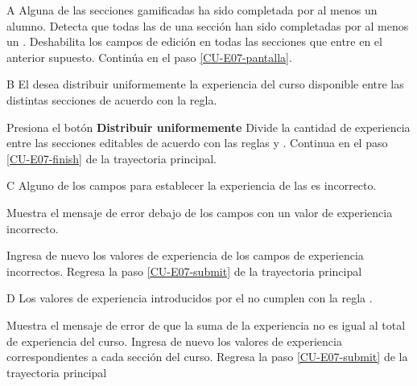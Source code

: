 \begin{UCtrayectoriaA}{A}{%
Alguna de las secciones gamificadas ha sido completada por al menos un alumno.
}
  \Sistema Detecta que todas las  de una sección
           han sido completadas por al menos un .
  \Sistema Deshabilita los campos de edición en todas las secciones que entre
           en el anterior supuesto.
  \Sistema Continúa en el paso \ref{CU-E07-pantalla}.
\end{UCtrayectoriaA}

\begin{UCtrayectoriaA}{B}{%
El  desea distribuir uniformemente la experiencia del curso
disponible entre las distintas secciones de acuerdo con la regla.}

  \Actor Presiona el botón {\bf Distribuir uniformemente}
  \Sistema Divide la cantidad de experiencia entre las secciones editables
           de acuerdo con las reglas  y .
  \Sistema Continua en el paso \ref{CU-E07-finish} de la trayectoria principal.
\end{UCtrayectoriaA}

\begin{UCtrayectoriaA}{C}{%
Alguno de los campos para establecer la experiencia de las %
 es incorrecto.}

  \Sistema Muestra el mensaje de error debajo de los campos con un valor de
           experiencia incorrecto.

  \Actor Ingresa de nuevo los valores de experiencia de los campos de experiencia
         incorrectos.
  \Sistema Regresa la paso \ref{CU-E07-submit} de la trayectoria principal
\end{UCtrayectoriaA}

\begin{UCtrayectoriaA}{D}{%
Los valores de experiencia introducidos por el  no cumplen con
la regla .}

  \Sistema Muestra el mensaje de error de que la suma de la experiencia no es igual
           al total de experiencia del curso.
  \Actor Ingresa de nuevo los valores de experiencia correspondientes a cada sección
         del curso.
  \Sistema Regresa la paso \ref{CU-E07-submit} de la trayectoria principal
\end{UCtrayectoriaA}
